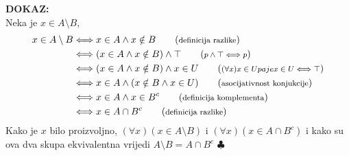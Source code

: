 \documentclass{article}
\newenvironment{dokaz}
    {\noindent\textbf{DOKAZ:}\\} {\hfill $\clubsuit$}
\begin{document}
\begin{dokaz}
    Neka je $x\in A\setminus B$,
    \begin{align*}
        x\in A\setminus B   &\Longleftrightarrow x\in A \land x\notin B                     \tag{\textrm{\footnotesize definicija razlike}}\\
                            &\Longleftrightarrow (x\in A \land x\notin B) \land \top        \tag{\textrm{\footnotesize $p\land \top \Longleftrightarrow p$}}\\
                            &\Longleftrightarrow (x\in A \land x\notin B) \land x\in U      \tag{\textrm{\footnotesize $(\forall x)x\in U pa je x\in U \Longleftrightarrow \top$}}\\
                            &\Longleftrightarrow x\in A \land (x\notin B\land x\in U)       \tag{\textrm{\footnotesize asocijativnost konjukcije}}\\
                            &\Longleftrightarrow x\in A \land x\in B^c                      \tag{\textrm{\footnotesize definicija komplementa}}\\
                            &\Longleftrightarrow x\in A\cap B^c                             \tag{\textrm{\footnotesize definicija razlike}}\\
    \end{align*}
    Kako je $x$ bilo proizvoljno, $(\forall x)(x\in A\setminus B)$ i $(\forall x)(x\in A\cap B^c)$ i kako su ova dva skupa ekvivalentna vrijedi $A\setminus B=A\cap B^c$
\end{dokaz}
\end{document}
